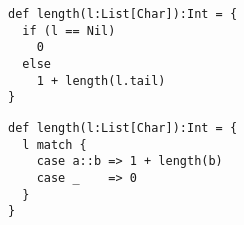 \documentclass[10pt]{article}\usepackage[correction,nu]{esial}
\begin{document}
\begin{Reponse}
\medskip\noindent
\begin{minipage}{.48\linewidth}
  \begin{Verbatim}[label=écriture fonctionnelle (sans return)]
def length(l:List[Char]):Int = {
  if (l == Nil)
    0
  else 
    1 + length(l.tail)
}
  \end{Verbatim}  
\end{minipage}\hfill%
\begin{minipage}{.48\linewidth}
  \begin{Verbatim}[numbers=right,label=avec un zoli filtrage]
def length(l:List[Char]):Int = {
  l match {
    case a::b => 1 + length(b)
    case _    => 0
  }
}
  \end{Verbatim}  
\end{minipage}

\end{Reponse}
\end{document}
